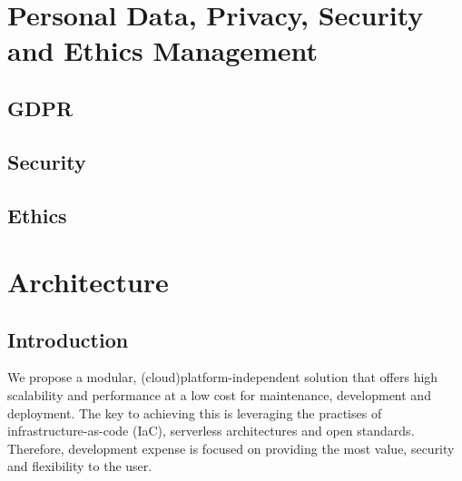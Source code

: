 \documentclass[10pt]{article}
\begin{document}
\newpage

\section{Personal Data, Privacy, Security and Ethics Management}
\subsection{GDPR}
\subsection{Security}
\subsection{Ethics}

\newpage
\section{Architecture}
\subsection{Introduction}
We propose a modular, (cloud)platform-independent solution that offers high scalability and performance at a low cost for maintenance, development and deployment. The key to achieving this is leveraging the practises of infrastructure-as-code (IaC), serverless architectures and open standards. Therefore, development expense is focused on providing the most value, security and flexibility to the user.\\
\end{document}
